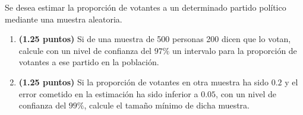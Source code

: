 
Se desea estimar la proporción de votantes a un determinado partido político mediante una muestra aleatoria.
\begin{enumerate}[label=\alph*)]
\item \textbf{(1.25 puntos)} Si de una muestra de 500 personas 200 dicen que lo votan, calcule con un nivel de confianza del $97\%$ un intervalo para la proporción de votantes a ese partido en la población.
\item \textbf{(1.25 puntos)} Si la proporción de votantes en otra muestra ha sido $0.2$ y el error cometido en la estimación ha sido inferior a $0.05$, con un nivel de confianza del $99\%$, calcule el tamaño mínimo de dicha muestra.
\end{enumerate}
